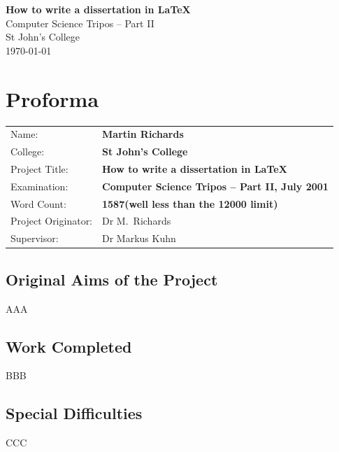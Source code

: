 \documentclass[12pt,a4paper,twoside,openright]{report}
\begin{document}

\pagestyle{empty}
\vspace*{60mm}
\begin{center}
\Huge
\textbf{How to write a dissertation in \LaTeX} \\[5mm]
Computer Science Tripos -- Part II \\[5mm]
St John's College \\[5mm]
\today %
\end{center}
\pagestyle{plain}
\chapter*{Proforma}
{\large
\begin{tabular}{ll}
Name: & \bf Martin Richards \\
College: & \bf St John's College \\
Project Title: & \bf How to write a dissertation in \LaTeX \\
Examination: & \bf Computer Science Tripos -- Part II, July 2001 \\
Word Count: & \bf 1587\footnotemark[1]
(well less than the 12000 limit) \\
Project Originator: & Dr M.~Richards \\
Supervisor: & Dr Markus Kuhn \\
\end{tabular}
}

\section*{Original Aims of the Project}
AAA

\section*{Work Completed}
BBB

\section*{Special Difficulties}
CCC

\newpage
\end{document}
